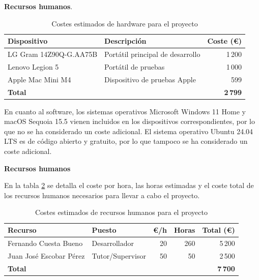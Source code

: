 \textbf{Recursos humanos}.

\begin{table}[!ht]
    \centering
    \begin{tabular}{|l|l|r|}
        \hline
        \textbf{Dispositivo}   & \textbf{Descripción}             & \textbf{Coste (€)} \\
        \hline
        LG Gram 14Z90Q-G.AA75B & Portátil principal de desarrollo & 1\,200             \\
        Lenovo Legion 5        & Portátil de pruebas              & 1\,000             \\
        Apple Mac Mini M4      & Dispositivo de pruebas Apple     & 599                \\
        \hline
        \textbf{Total}         &                                  & \textbf{2\,799}    \\
        \hline
    \end{tabular}
    \caption{Costes estimados de hardware para el proyecto}
    \label{tab:costes-hardware}
\end{table}

En cuanto al software, los sistemas operativos Microsoft Windows 11 Home y macOS Sequoia 15.5 vienen incluidos en los dispositivos correspondientes, por lo que no se ha considerado un coste adicional. El sistema operativo Ubuntu 24.04 LTS es de código abierto y gratuito, por lo que tampoco se ha considerado un coste adicional.

\textbf{Recursos humanos}

En la tabla \ref{tab:recursos-humanos} se detalla el coste por hora, las horas estimadas y el coste total de los recursos humanos necesarios para llevar a cabo el proyecto.

\begin{table}[!ht]
    \centering
    \begin{tabular}{|l|l|r|r|r|}
        \hline
        \textbf{Recurso}        & \textbf{Puesto}  & \textbf{€/h} & \textbf{Horas} & \textbf{Total (€)} \\
        \hline
        Fernando Cuesta Bueno   & Desarrollador    & 20           & 260            & 5\,200             \\
        Juan José Escobar Pérez & Tutor/Supervisor & 50           & 50             & 2\,500             \\
        \hline
        \textbf{Total}          &                  &              &                & \textbf{7\,700}    \\
        \hline
    \end{tabular}
    \caption{Costes estimados de recursos humanos para el proyecto}
    \label{tab:recursos-humanos}
\end{table}

